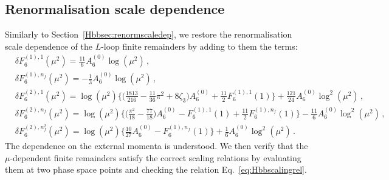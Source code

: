 \documentclass[main.tex]{subfiles}
\begin{document}
\subsection{Renormalisation scale dependence}
\label{wyjsec:scaledep}
Similarly to Section~\ref{Hbbsec:renormscaledep}, we restore the renormalisation scale dependence of the $L$-loop finite remainders by adding to them the terms:
\begingroup
\allowdisplaybreaks
\begin{align}
& \delta F^{(1),1}_6\left(\mu^2\right) = \frac{11}{6} A_6^{(0)} \log\left(\mu^2\right) \,, \\
& \delta F^{(1),n_f}_6\left(\mu^2\right) = - \frac{1}{3} A_6^{(0)} \log\left(\mu^2\right) \,, \\
& \delta F^{(2),1}_6\left(\mu^2\right) = \log(\mu^2) \bigg\lbrace \bigg(\frac{1813}{216} - \frac{11}{36}\pi^2 + 8 \zeta_3\bigg) A^{(0)}_6 + \frac{11}{2}F^{(1),1}_6(1) \bigg\rbrace
                             + \frac{121}{24} A^{(0)}_6 \log^2(\mu^2) \,, \\
& \delta F^{(2),n_f}_6\left(\mu^2\right) = \log(\mu^2) \bigg\lbrace \bigg(\frac{\pi^2}{18} -\frac{77}{18}  \bigg) A^{(0)}_6 
                                                                 - F^{(1),1}_6(1)  + \frac{11}{2}F^{(1),n_f}_6(1) \bigg\rbrace - \frac{11}{6} A^{(0)}_6 \log^2(\mu^2) \,, \\
& \delta F^{(2),n_f^2}_6\left(\mu^2\right) = \log(\mu^2) \bigg\lbrace \frac{10}{27} A^{(0)}_6 -  F^{(1),n_f}_6(1) \bigg\rbrace + \frac{1}{6} A^{(0)}_6 \log^2(\mu^2) \,.
\end{align}
\endgroup
The dependence on the external momenta is understood. We then verify that the $\mu$-dependent finite remainders satisfy the correct scaling relations by evaluating them at two phase space points and checking the relation Eq.~\ref{eq:Hbbscalingrel}.
\end{document}
